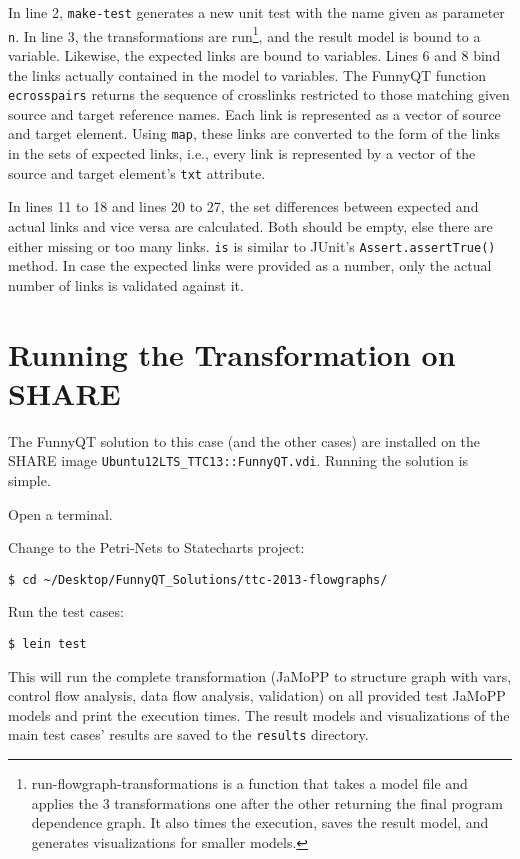 \documentclass[11pt]{article}
\begin{document}
In line 2, \verb|make-test| generates a new unit test with the name given as
parameter \verb|n|.  In line 3, the transformations are
run\footnote{\textsf{run-flowgraph-transformations} is a function that takes a
  model file and applies the 3 transformations one after the other returning
  the final program dependence graph.  It also times the execution, saves the
  result model, and generates visualizations for smaller models.}, and the
result model is bound to a variable.  Likewise, the expected links are bound to
variables.  Lines 6 and 8 bind the links actually contained in the model to
variables.  The FunnyQT function \verb|ecrosspairs| returns the sequence of
crosslinks restricted to those matching given source and target reference
names.  Each link is represented as a vector of source and target element.
Using \verb|map|, these links are converted to the form of the links in the
sets of expected links, i.e., every link is represented by a vector of the
source and target element's \verb|txt| attribute.

In lines 11 to 18 and lines 20 to 27, the set differences between expected and
actual links and vice versa are calculated.  Both should be empty, else there
are either missing or too many links.  \verb|is| is similar to JUnit's
\verb|Assert.assertTrue()| method.  In case the expected links were provided as
a number, only the actual number of links is validated against it.


\section{Running the Transformation on SHARE}
\label{sec:run-transformation}

The FunnyQT solution to this case (and the other cases) are installed on the
SHARE image \verb|Ubuntu12LTS_TTC13::FunnyQT.vdi|.  Running the solution is
simple.

\begin{compactenum}
\item Open a terminal.
\item Change to the Petri-Nets to Statecharts project:

  \verb|$ cd ~/Desktop/FunnyQT_Solutions/ttc-2013-flowgraphs/|
\item Run the test cases:

  \verb|$ lein test|
\end{compactenum}

This will run the complete transformation (JaMoPP to structure graph with vars,
control flow analysis, data flow analysis, validation) on all provided test
JaMoPP models and print the execution times.  The result models and
visualizations of the main test cases' results are saved to the \verb|results|
directory.
\end{document}
